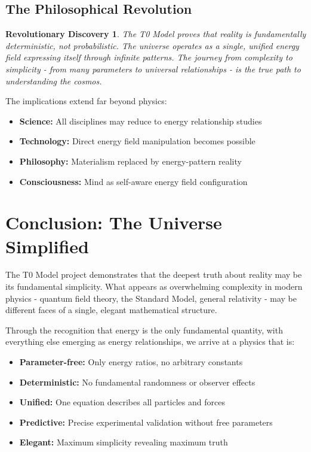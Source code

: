 \documentclass[12pt,a4paper]{report}
\newtheorem{discovery}{Revolutionary Discovery}[chapter]
\begin{document}
	\section{The Philosophical Revolution}
	
	\begin{discovery}
		The T0 Model proves that reality is fundamentally deterministic, not probabilistic. The universe operates as a single, unified energy field expressing itself through infinite patterns. The journey from complexity to simplicity - from many parameters to universal relationships - is the true path to understanding the cosmos.
	\end{discovery}
	
	The implications extend far beyond physics:
	\begin{itemize}
		\item \textbf{Science:} All disciplines may reduce to energy relationship studies
		\item \textbf{Technology:} Direct energy field manipulation becomes possible
		\item \textbf{Philosophy:} Materialism replaced by energy-pattern reality
		\item \textbf{Consciousness:} Mind as self-aware energy field configuration
	\end{itemize}
	
	\chapter{Conclusion: The Universe Simplified}
	
	The T0 Model project demonstrates that the deepest truth about reality may be its fundamental simplicity. What appears as overwhelming complexity in modern physics - quantum field theory, the Standard Model, general relativity - may be different faces of a single, elegant mathematical structure.
	
	Through the recognition that energy is the only fundamental quantity, with everything else emerging as energy relationships, we arrive at a physics that is:
	
	\begin{itemize}
		\item \textbf{Parameter-free:} Only energy ratios, no arbitrary constants
		\item \textbf{Deterministic:} No fundamental randomness or observer effects
		\item \textbf{Unified:} One equation describes all particles and forces
		\item \textbf{Predictive:} Precise experimental validation without free parameters
		\item \textbf{Elegant:} Maximum simplicity revealing maximum truth
	\end{itemize}
	
\end{document}
